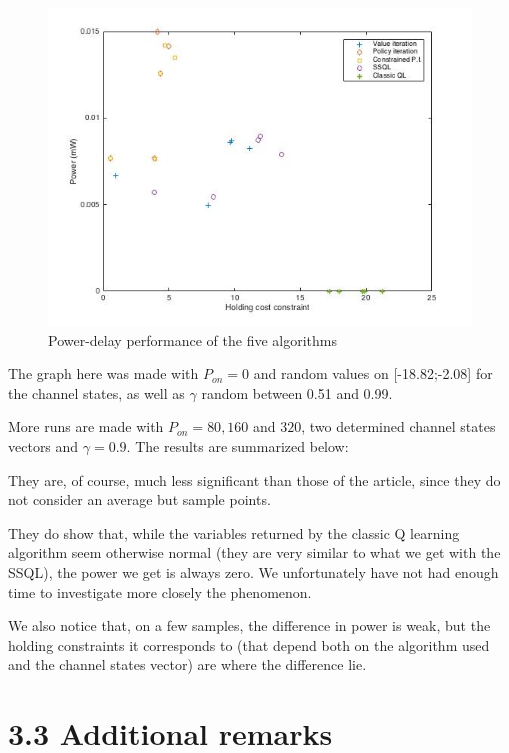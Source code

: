 \documentclass[a4paper, 12pt]{report}
\begin{document}
\begin{figure}[H]
\begin{center}
\includegraphics[width=14cm]{power_delay.jpg}
\caption{Power-delay performance of the five algorithms}
\end{center}
\end{figure}

The graph here was made with $P_{on}=0$ and random values on [-18.82;-2.08] for the channel states, as well as $\gamma$ random between 0.51 and 0.99.

More runs are made with $P_{on}=80, 160$ and $320$, two determined channel states vectors and $\gamma=0.9$.
The results are summarized below:


They are, of course, much less significant than those of the article, since they do not consider an average but sample points.

They do show that, while the variables returned by the classic Q learning algorithm seem otherwise normal (they are very similar to what we get with the SSQL), the power we get is always zero. We unfortunately have not had enough time to investigate more closely the phenomenon.

We also notice that, on a few samples, the difference in power is weak, but the holding constraints it corresponds to (that depend
both on the algorithm used and the channel states vector) are where the difference lie.

\section*{3.3 Additional remarks}
\end{document}
